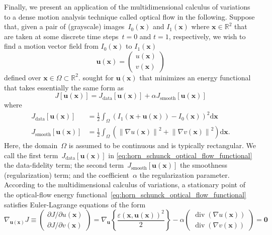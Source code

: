 \documentclass[12pt,a4paper]{article}
\begin{document}
Finally, we present an application of the multidimensional calculus of variations to
a dense motion analysis technique called optical flow in the following.
Suppose that, given a pair of (grayscale) images~$I_0(\mathbf{x})$ and $I_1(\mathbf{x})$
where $\mathbf{x} \in \mathbb{R}^{2}$ that are taken at
some discrete time steps~$t=0$ and $t=1$, respectively,
we wish to find a motion vector field from $I_0(\mathbf{x})$ to $I_1(\mathbf{x})$
\begin{equation}
\mathbf{u}(\mathbf{x}) =
\begin{pmatrix}
u(\mathbf{x}) \\
v(\mathbf{x})
\end{pmatrix}
\end{equation}
defined over $\mathbf{x} \in \Omega \subset \mathbb{R}^{2}$.
\citet{HornSchunck:OpticalFlow} sought for $\mathbf{u}(\mathbf{x})$ that minimizes
an energy functional that takes essentially the same form as
\begin{equation}
J[\mathbf{u}(\mathbf{x})] =
J_{\text{data}}[\mathbf{u}(\mathbf{x})] + \alpha J_{\text{smooth}}[\mathbf{u}(\mathbf{x})]
\label{eq:horn_schunck_optical_flow_functional}
\end{equation}
where
\begin{align}
J_{\text{data}}[\mathbf{u}(\mathbf{x})] &=
\frac{1}{2} \int_{\Omega} \left(
  I_1(\mathbf{x} + \mathbf{u}(\mathbf{x})) - I_0(\mathbf{x})
 \right)^2 \mathrm{d}\mathbf{x} \\
J_{\text{smooth}}[\mathbf{u}(\mathbf{x})] &=
\frac{1}{2} \int_{\Omega} \left (
  \left\| \nabla u(\mathbf{x}) \right\|^2 + \left\| \nabla v(\mathbf{x})\right\|^2
 \right) \mathrm{d}\mathbf{x} .
\end{align}
Here, the domain~$\Omega$ is assumed to be continuous and is typically rectangular.
We call the first term~$J_{\text{data}}[\mathbf{u}(\mathbf{x})]$ in
\eqref{eq:horn_schunck_optical_flow_functional} the data-fidelity term;
the second term~$J_{\text{smooth}}[\mathbf{u}(\mathbf{x})]$ the smoothness (regularization) term;
and the coefficient~$\alpha$ the regularization parameter.
According to the multidimensional calculus of variations, a stationary point of
the optical-flow energy functional~\eqref{eq:horn_schunck_optical_flow_functional} satisfies
Euler-Lagrange equations of the form
\begin{equation}
\nabla_{\mathbf{u}(\mathbf{x})} J
\equiv
\begin{pmatrix}
\partial J / \partial u(\mathbf{x}) \\
\partial J / \partial v(\mathbf{x})
\end{pmatrix}
=
\nabla_{\mathbf{u}} \left\{
\frac{ {\varepsilon\left(\mathbf{x}, \mathbf{u}(\mathbf{x})\right)}^{2} }{2}
\right\}
- \alpha
\begin{pmatrix}
\operatorname{div}\left(\nabla u(\mathbf{x})\right) \\
\operatorname{div}\left(\nabla v(\mathbf{x})\right)
\end{pmatrix}
=
\mathbf{0}
\label{eq:euler_lagrange_equations_for_optical_flow}
\end{equation}
\end{document}

